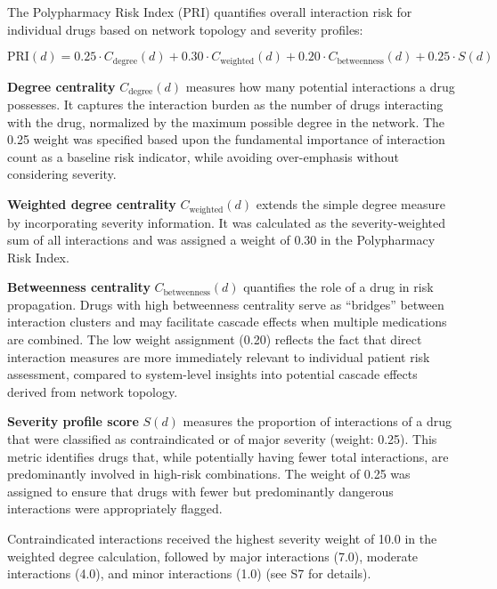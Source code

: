 \documentclass[12pt,a4paper]{article}
\begin{document}
The Polypharmacy Risk Index (PRI) quantifies overall interaction risk for individual drugs based on network topology and severity profiles:

\[
\text{PRI}(d) = 0.25 \cdot C_{\text{degree}}(d) + 0.30 \cdot C_{\text{weighted}}(d) + 0.20 \cdot C_{\text{betweenness}}(d) + 0.25 \cdot S(d)
\]

\textbf{Degree centrality} $C_{\text{degree}}(d)$ measures how many potential interactions a drug possesses. It captures the interaction burden as the number of drugs interacting with the drug, normalized by the maximum possible degree in the network. The 0.25 weight was specified based upon the fundamental importance of interaction count as a baseline risk indicator, while avoiding over-emphasis without considering severity.

\textbf{Weighted degree centrality} $C_{\text{weighted}}(d)$ extends the simple degree measure by incorporating severity information. It was calculated as the severity-weighted sum of all interactions and was assigned a weight of 0.30 in the Polypharmacy Risk Index.

\textbf{Betweenness centrality} $C_{\text{betweenness}}(d)$ quantifies the role of a drug in risk propagation. Drugs with high betweenness centrality serve as ``bridges'' between interaction clusters and may facilitate cascade effects when multiple medications are combined. The low weight assignment (0.20) reflects the fact that direct interaction measures are more immediately relevant to individual patient risk assessment, compared to system-level insights into potential cascade effects derived from network topology.

\textbf{Severity profile score} $S(d)$ measures the proportion of interactions of a drug that were classified as contraindicated or of major severity (weight: 0.25). This metric identifies drugs that, while potentially having fewer total interactions, are predominantly involved in high-risk combinations. The weight of 0.25 was assigned to ensure that drugs with fewer but predominantly dangerous interactions were appropriately flagged.

Contraindicated interactions received the highest severity weight of 10.0 in the weighted degree calculation, followed by major interactions (7.0), moderate interactions (4.0), and minor interactions (1.0) (see S7 for details).
\end{document}
